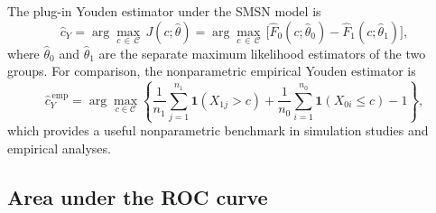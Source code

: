 \documentclass[11pt,a4paper]{article}
\theoremstyle{definition}
\theoremstyle{remark}
\newtheorem{remark}[theorem]{Remark}
\newcommand{\1}{\mathbf{1}}
\begin{document}
The plug-in Youden estimator under the SMSN model is
\begin{equation}
\label{eq:youden-estimator}
\hat{c}_Y
= \arg\max_{c \,\in \,\mathcal{C}}\,
  J(c;\hat\theta)
= \arg\max_{c \, \in \, \mathcal{C}}\,
  \bigl[\hat F_0(c;\hat\theta_0) - \hat F_1(c;\hat\theta_1)\bigr],
\end{equation}
where $\hat\theta_0$ and $\hat\theta_1$ are the separate
maximum likelihood estimators of the two groups.
For comparison, the nonparametric empirical Youden
estimator is
\begin{equation}
\label{eq:youden-empirical}
\hat{c}_Y^{\,\mathrm{emp}}
= \arg\max_{c \in \mathcal{C}}
  \left\{
    \frac{1}{n_1}\sum_{j=1}^{n_1}\mathbf{1}(X_{1j} > c)
    +
    \frac{1}{n_0}\sum_{i=1}^{n_0}\mathbf{1}(X_{0i} \leq c)
    - 1
  \right\},
\end{equation}
which provides a useful nonparametric benchmark in
simulation studies and empirical analyses.



\subsection{Area under the ROC curve}
\label{subsec:auc}
\end{document}
